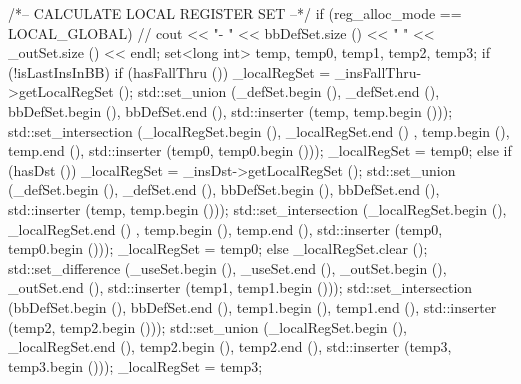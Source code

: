 \begin{DoxyCode}
{    /*-- CALCULATE LOCAL REGISTER SET --*/
    if (reg_alloc_mode == LOCAL_GLOBAL) {
//        cout << "- " << bbDefSet.size () << " " << _outSet.size () << endl;
        set<long int> temp, temp0, temp1, temp2, temp3;
        if (!isLastInsInBB) {
            if (hasFallThru ()) {
                _localRegSet = _insFallThru->getLocalRegSet ();
                std::set_union (_defSet.begin (), _defSet.end (), 
                        bbDefSet.begin (), bbDefSet.end (), 
                        std::inserter (temp, temp.begin ()));
                std::set_intersection (_localRegSet.begin (), _localRegSet.end ()
      , 
                        temp.begin (), temp.end (), 
                        std::inserter (temp0, temp0.begin ()));
                _localRegSet = temp0;
            } else if (hasDst ()) {
                _localRegSet = _insDst->getLocalRegSet ();
                std::set_union (_defSet.begin (), _defSet.end (), 
                        bbDefSet.begin (), bbDefSet.end (), 
                        std::inserter (temp, temp.begin ()));
                std::set_intersection (_localRegSet.begin (), _localRegSet.end ()
      , 
                        temp.begin (), temp.end (), 
                        std::inserter (temp0, temp0.begin ()));
                _localRegSet = temp0;
            }
        } else {
            _localRegSet.clear ();
        }
        std::set_difference (_useSet.begin (), _useSet.end (), 
                             _outSet.begin (), _outSet.end (), 
                             std::inserter (temp1, temp1.begin ()));
        std::set_intersection (bbDefSet.begin (), bbDefSet.end (), 
                               temp1.begin (), temp1.end (),
                               std::inserter (temp2, temp2.begin ()));
        std::set_union (_localRegSet.begin (), _localRegSet.end (), 
                        temp2.begin (), temp2.end (), 
                        std::inserter (temp3, temp3.begin ()));
        _localRegSet = temp3;
    }

}
\end{DoxyCode}
